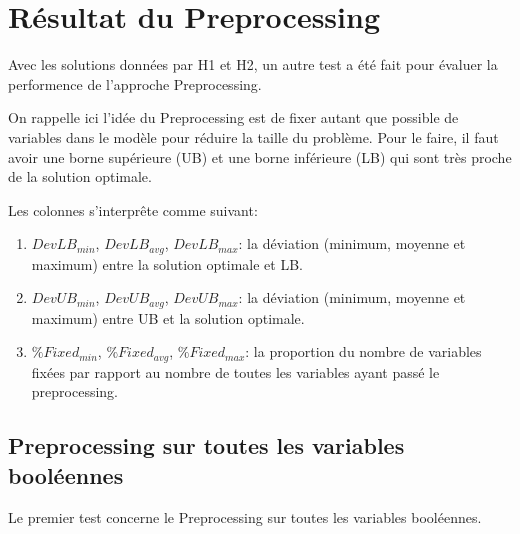 \documentclass[twoside,fleqn]{EPURapport}
\begin{document}
\section{Résultat du Preprocessing}
Avec les solutions données par H1 et H2, un autre test a été fait pour évaluer la performence de l'approche Preprocessing.


On rappelle ici l'idée du Preprocessing est de fixer autant que possible de variables dans le modèle pour réduire la taille du problème. Pour le faire, il faut avoir une borne supérieure (UB) et une borne inférieure (LB) qui sont très proche de la solution optimale.


Les colonnes s'interprête comme suivant:
\begin{enumerate}
	\item $DevLB_{min}$, $DevLB_{avg}$, $DevLB_{max}$: la déviation (minimum, moyenne et maximum) entre la solution optimale et LB.
	\item $DevUB_{min}$, $DevUB_{avg}$, $DevUB_{max}$: la déviation (minimum, moyenne et maximum) entre UB et la solution optimale.
	\item $\%Fixed_{min}$, $\%Fixed_{avg}$, $\%Fixed_{max}$: la proportion du nombre de variables fixées par rapport au nombre de toutes les variables ayant passé le preprocessing.
\end{enumerate}

\subsection{Preprocessing sur toutes les variables booléennes}
Le premier test concerne le Preprocessing sur toutes les variables booléennes.
\end{document}
